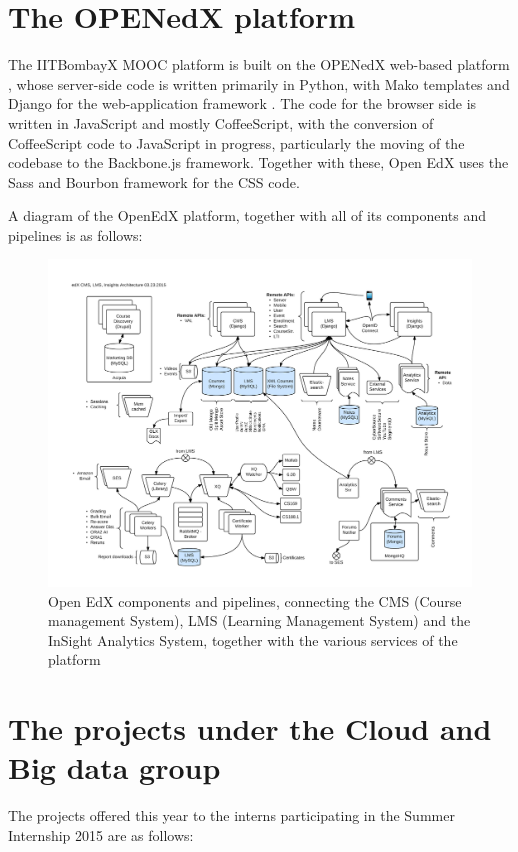 \documentclass[14pt]{article}
\begin{document}
\section{The OPENedX platform}

The IITBombayX MOOC platform is built on the OPENedX web-based platform \cite{OPENedXofficialarch}, whose server-side code is written primarily in Python, with Mako templates \cite{Mako} and Django for the web-application framework \cite{Django}. The code for the browser side is written in JavaScript and mostly CoffeeScript, with the conversion of CoffeeScript code to JavaScript in progress, particularly the moving of the codebase to the Backbone.js framework. Together with these, Open EdX uses the Sass and Bourbon framework for the CSS code.

A diagram of the OpenEdX platform, together with all of its components and pipelines is as follows:

\begin{figure}[hb]
 \centering
 \includegraphics[width=12cm]{./edX_architecture_CMS_LMS_0.png}
 \caption{Open EdX components and pipelines, connecting the CMS (Course management System), LMS (Learning Management System) and the InSight Analytics System, together with the various services of the platform \label{fig:Image1}}
\end{figure}

\pagebreak

\section{The projects under the Cloud and Big data group}
The projects offered this year to the interns participating in the Summer Internship 2015 are as follows:
\end{document}
